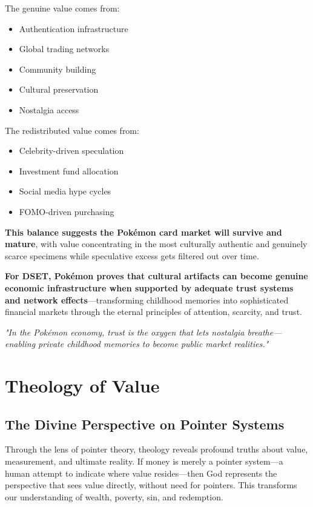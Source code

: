 \documentclass[11pt,oneside]{book}
\begin{document}
{{{{{{The genuine value comes from:
\begin{itemize}
\item Authentication infrastructure
\item Global trading networks
\item Community building
\item Cultural preservation
\item Nostalgia access
\end{itemize}

The redistributed value comes from:
\begin{itemize}
\item Celebrity-driven speculation
\item Investment fund allocation
\item Social media hype cycles
\item FOMO-driven purchasing
\end{itemize}

\textbf{This balance suggests the Pokémon card market will survive and mature}, with value concentrating in the most culturally authentic and genuinely scarce specimens while speculative excess gets filtered out over time.

\textbf{For DSET, Pokémon proves that cultural artifacts can become genuine economic infrastructure when supported by adequate trust systems and network effects}—transforming childhood memories into sophisticated financial markets through the eternal principles of attention, scarcity, and trust.

\textit{"In the Pokémon economy, trust is the oxygen that lets nostalgia breathe—enabling private childhood memories to become public market realities."}

\chapter{Theology of Value}

\section{The Divine Perspective on Pointer Systems}

Through the lens of pointer theory, theology reveals profound truths about value, measurement, and ultimate reality. If money is merely a pointer system—a human attempt to indicate where value resides—then God represents the perspective that sees value directly, without need for pointers. This transforms our understanding of wealth, poverty, sin, and redemption.

}}}}}}
\end{document}
